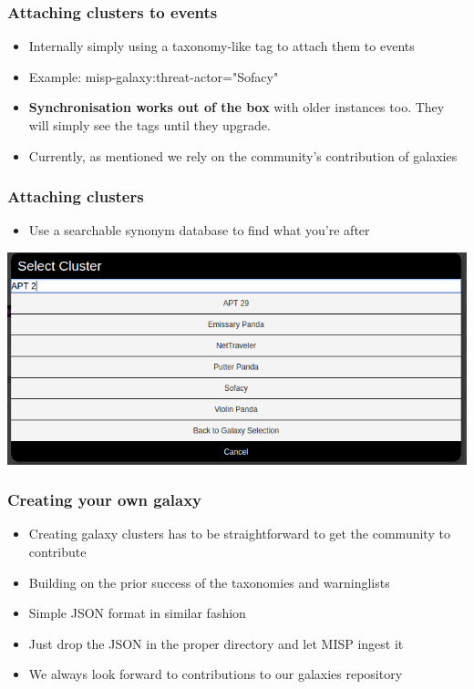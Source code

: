 \begin{frame}
\frametitle{Attaching clusters to events}
    \begin{itemize}
    	\item Internally simply using a taxonomy-like tag to attach them to events
    	\item Example: misp-galaxy:threat-actor="Sofacy"
        \item {\bf Synchronisation works out of the box} with older instances too. They will simply see the tags until they upgrade.
       	\item Currently, as mentioned we rely on the community's contribution of galaxies
    \end{itemize}
\end{frame}

\begin{frame}
\frametitle{Attaching clusters}
	\begin{itemize}
		\item Use a searchable synonym database to find what you're after
	\end{itemize}
\includegraphics[scale=0.4]{screenshots/addcluster.png}
\end{frame}

\begin{frame}
\frametitle{Creating your own galaxy}
    \begin{itemize}
    	\item Creating galaxy clusters has to be straightforward to get the community to contribute
    	\item Building on the prior success of the taxonomies and warninglists
        \item Simple JSON format in similar fashion
        \item Just drop the JSON in the proper directory and let MISP ingest it
        \item We always look forward to contributions to our galaxies repository
    \end{itemize}
\end{frame}

